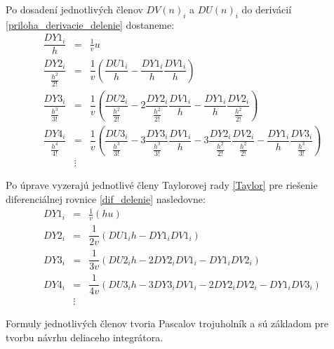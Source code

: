 Po dosadení jednotlivých členov $ DV(n)_{i} $ a $ DU(n)_{i} $ do derivácií \ref{priloha_derivacie_delenie} dostaneme:
\begin{eqnarray}
\dfrac{DY1_{i}}{h} & = & \frac{1}{v} u~\\
\dfrac{DY2_{i}}{\frac{h^{2}}{2!}} & = & \dfrac{1}{v} ( \dfrac{DU1_{i}}{h} - \dfrac{DY1_{i}}{h}\dfrac{DV1_{i}}{h} ) \nonumber \\
\dfrac{DY3_{i}}{\frac{h^{3}}{3!}} & = & \dfrac{1}{v} 
( \dfrac{DU2_{i}}{\frac{h^{2}}{2!}} - 
2\dfrac{DY2_{i}}{\frac{h^{2}}{2!}} \dfrac{DV1_{i}}{h} - 
\dfrac{DY1_{i}}{h} \dfrac{DV2_{i}}{\frac{h^{2}}{2!}} ) \nonumber \\
\dfrac{DY4_{i}}{\frac{h^{4}}{4!}} & = & \dfrac{1}{v} 
( \dfrac{DU3_{i}}{\frac{h^{3}}{3!}} - 
3\dfrac{DY3_{i}}{\frac{h^{3}}{3!}} \dfrac{DV1_{i}}{h} - 
3\dfrac{DY2_{i}}{\frac{h^{2}}{2!}} \dfrac{DV2_{i}}{\frac{h^{2}}{2!}} -
\dfrac{DY1_{i}}{h} \dfrac{DV3_{i}}{\frac{h^{3}}{3!}} ) \nonumber \\
& \vdots \nonumber & 
\end{eqnarray}

Po úprave vyzerajú jednotlivé členy Taylorovej rady \eqref{Taylor} pre riešenie diferenciálnej rovnice \eqref{dif_delenie} nasledovne:
\begin{eqnarray}
DY1_{i} & = & \frac{1}{v} (hu)  \\
DY2_{i} & = & \dfrac{1}{2v} (DU1_{i}h - DY1_{i}DV1_{i}) \\
DY3_{i} & = & \dfrac{1}{3v} ( DU2_{i}h - 2DY2_{i}DV1_{i} - DY1_{i}DV2_{i} ) \\
DY4_{i} & = & \dfrac{1}{4v} ( DU3_{i}h - 3DY3_{i}DV1_{i} - 2DY2_{i}DV2_{i} - DY1_{i}DV3_{i} ) \\ 
& \vdots \nonumber & 
\end{eqnarray}


Formuly jednotlivých členov tvoria Pascalov trojuholník a sú základom pre tvorbu návrhu deliaceho integrátora.
